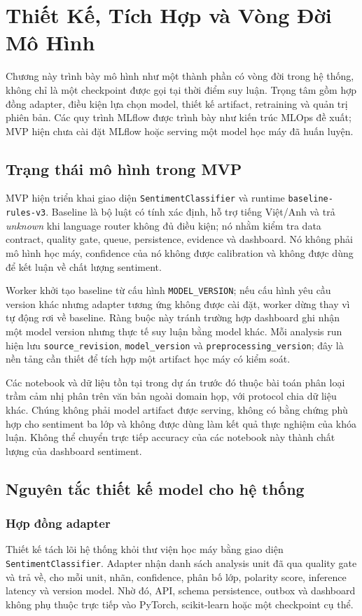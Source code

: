 \chapter{Thiết Kế, Tích Hợp và Vòng Đời Mô Hình}
\label{chap:model}

Chương này trình bày mô hình như một thành phần có vòng đời trong hệ thống, không chỉ là một checkpoint được gọi tại thời điểm suy luận. Trọng tâm gồm hợp đồng adapter, điều kiện lựa chọn model, thiết kế artifact, retraining và quản trị phiên bản. Các quy trình MLflow được trình bày như kiến trúc MLOps đề xuất; MVP hiện chưa cài đặt MLflow hoặc serving một model học máy đã huấn luyện.

\section{Trạng thái mô hình trong MVP}
MVP hiện triển khai giao diện \texttt{SentimentClassifier} và runtime \texttt{baseline-rules-v3}. Baseline là bộ luật có tính xác định, hỗ trợ tiếng Việt/Anh và trả \textit{unknown} khi language router không đủ điều kiện; nó nhằm kiểm tra data contract, quality gate, queue, persistence, evidence và dashboard. Nó không phải mô hình học máy, confidence của nó không được calibration và không được dùng để kết luận về chất lượng sentiment.

Worker khởi tạo baseline từ cấu hình \texttt{MODEL\_VERSION}; nếu cấu hình yêu cầu version khác nhưng adapter tương ứng không được cài đặt, worker dừng thay vì tự động rơi về baseline. Ràng buộc này tránh trường hợp dashboard ghi nhận một model version nhưng thực tế suy luận bằng model khác. Mỗi analysis run hiện lưu \texttt{source\_revision}, \texttt{model\_version} và \texttt{preprocessing\_version}; đây là nền tảng cần thiết để tích hợp một artifact học máy có kiểm soát.

Các notebook và dữ liệu tồn tại trong dự án trước đó thuộc bài toán phân loại trầm cảm nhị phân trên văn bản ngoài domain họp, với protocol chia dữ liệu khác. Chúng không phải model artifact được serving, không có bằng chứng phù hợp cho sentiment ba lớp và không được dùng làm kết quả thực nghiệm của khóa luận. Không thể chuyển trực tiếp accuracy của các notebook này thành chất lượng của dashboard sentiment.

\section{Nguyên tắc thiết kế model cho hệ thống}
\subsection{Hợp đồng adapter}
Thiết kế tách lõi hệ thống khỏi thư viện học máy bằng giao diện \texttt{Sentiment\allowbreak Classifier}. Adapter nhận danh sách analysis unit đã qua quality gate và trả về, cho mỗi unit, nhãn, confidence, phân bố lớp, polarity score, inference latency và version model. Nhờ đó, API, schema persistence, outbox và dashboard không phụ thuộc trực tiếp vào PyTorch, scikit-learn hoặc một checkpoint cụ thể.

